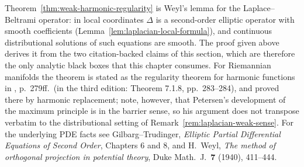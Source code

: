 \begin{remark}
\label{rem:weak-harmonic-regularity-citation}
Theorem~\ref{thm:weak-harmonic-regularity} is Weyl's lemma for the
Laplace--Beltrami operator: in local coordinates $\Delta$ is a
second-order elliptic operator with smooth coefficients
(Lemma~\ref{lem:laplacian-local-formula}), and continuous
distributional solutions of such equations are smooth. The proof
given above derives it from the two citation-backed claims of this
section, which are therefore the only analytic black boxes that
this chapter consumes. For Riemannian manifolds the theorem is
stated as the regularity theorem for harmonic functions in
\cite{Petersen}, p.~279ff.\ (in the third edition: Theorem 7.1.8,
pp.~283--284), and proved there by harmonic replacement; note,
however, that Petersen's development of the maximum principle is
in the barrier sense, so his argument does not transpose verbatim
to the distributional setting of
Remark~\ref{rem:laplacian-weak-sense}. For the underlying PDE
facts see Gilbarg--Trudinger, {\it Elliptic Partial Differential
Equations of Second Order}, Chapters 6 and 8, and H.~Weyl, {\it
The method of orthogonal projection in potential theory}, Duke
Math.~J.\ {\bf 7} (1940), 411--444.
\end{remark}
